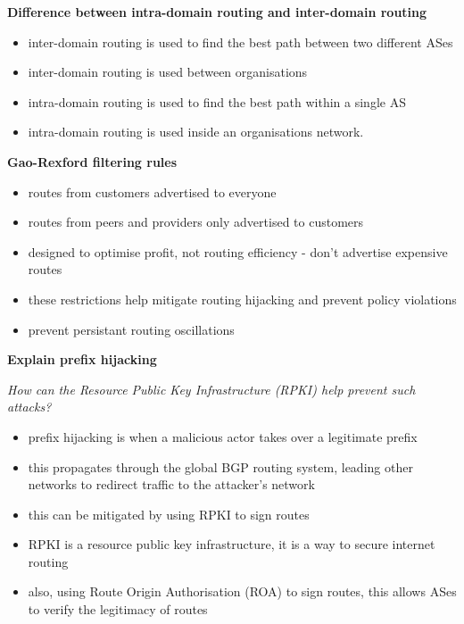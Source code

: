 \documentclass{article}
\begin{document}
\textbf{Difference between intra-domain routing and inter-domain routing}
\begin{itemize}
    \item inter-domain routing is used to find the best path between two different ASes
    \item inter-domain routing is used between organisations
    \item intra-domain routing is used to find the best path within a single AS
    \item intra-domain routing is used inside an organisations network.
\end{itemize}

\textbf{Gao-Rexford filtering rules}
\begin{itemize}
    \item routes from customers advertised to everyone
    \item routes from peers and providers only advertised to customers
    \item designed to optimise profit, not routing efficiency {-} don't advertise expensive routes
    \item these restrictions help mitigate routing hijacking and prevent policy violations
    \item prevent persistant routing oscillations %
\end{itemize}

\textbf{Explain prefix hijacking}

\textit{How can the Resource Public Key Infrastructure (RPKI) help prevent such attacks?}
\begin{itemize}
    \item prefix hijacking is when a malicious actor takes over a legitimate prefix
    \item this propagates through the global BGP routing system, leading other networks to redirect traffic to the attacker's network
    \item this can be mitigated by using RPKI to sign routes
    \item RPKI is a resource public key infrastructure, it is a way to secure internet routing
    \item also, using Route Origin Authorisation (ROA) to sign routes, this allows ASes to verify the legitimacy of routes
\end{itemize}
\end{document}

